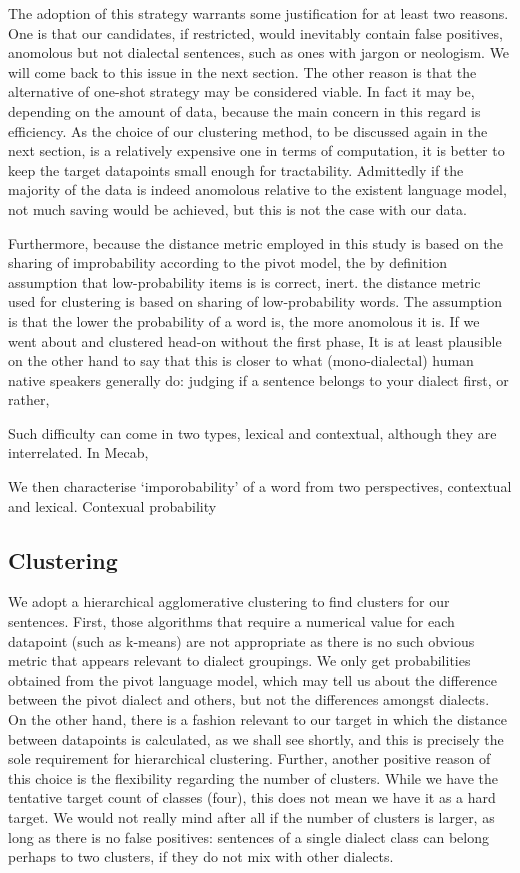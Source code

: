 \documentclass{article}
\begin{document}
The adoption of this strategy warrants some justification for at least two reasons. One is that our candidates, if restricted, would inevitably contain false positives, anomolous but not dialectal sentences, such as ones with jargon or neologism. We will come back to this issue in the next section. The other reason is that the alternative of one-shot strategy may be considered viable. In fact it may be, depending on the amount of data, because the main concern in this regard is efficiency. As the choice of our clustering method, to be discussed again in the next section, is a relatively expensive one in terms of computation, it is better to keep the target datapoints small enough for tractability. Admittedly if the majority of the data is indeed anomolous relative to the existent language model, not much saving would be achieved, but this is not the case with our data. 

Furthermore, because the distance metric employed in this study is based on the sharing of improbability according to the pivot model, the  by definition assumption that low-probability items is is correct,  inert. the distance metric used for clustering is based on sharing of low-probability words. The assumption is that the lower the probability of a word is, the more anomolous it is. If we went about and clustered head-on without the first phase,   It is at least plausible on the other hand to say that this is closer to what (mono-dialectal) human native speakers generally do: judging if a sentence belongs to your dialect first, or rather,  

Such difficulty can come in two types, lexical and contextual, although they are interrelated. In Mecab, 

We then characterise `imporobability' of a word from two perspectives, contextual and lexical. Contexual probability  

\subsection{Clustering}

We adopt a hierarchical agglomerative clustering to find clusters for our sentences. First, those algorithms that require a numerical value for each datapoint (such as k-means) are not appropriate as there is no such obvious metric that appears relevant to dialect groupings. We only get probabilities obtained from the pivot language model, which may tell us about the difference between the pivot dialect and others, but not the differences amongst dialects. On the other hand, there is a fashion relevant to our target in which the distance between datapoints is calculated, as we shall see shortly, and this is precisely the sole requirement for hierarchical clustering. Further, another positive reason of this choice is the flexibility regarding the number of clusters. While we have the tentative target count of classes (four), this does not mean we have it as a hard target. We would not really mind after all if the number of clusters is larger, as long as there is no false positives: sentences of a single dialect class can belong perhaps to two clusters, if they do not mix with other dialects.
\end{document}

